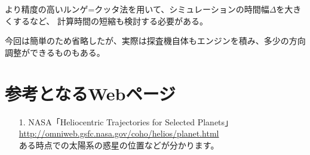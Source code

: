 \documentclass{article}
\begin{document}
より精度の高いルンゲ=クッタ法を用いて、シミュレーションの時間幅$\Delta$を大きくするなど、
計算時間の短縮も検討する必要がある。

今回は簡単のため省略したが、実際は探査機自体もエンジンを積み、多少の方向調整ができるものもある。

\section{ 参考となるWebページ }

\begin{itemize}
\item[1.] NASA「Heliocentric Trajectories for Selected Planets」\\ \url{http://omniweb.gsfc.nasa.gov/coho/helios/planet.html}
       \\ ある時点での太陽系の惑星の位置などが分かります。
\end{itemize}
\end{document}
